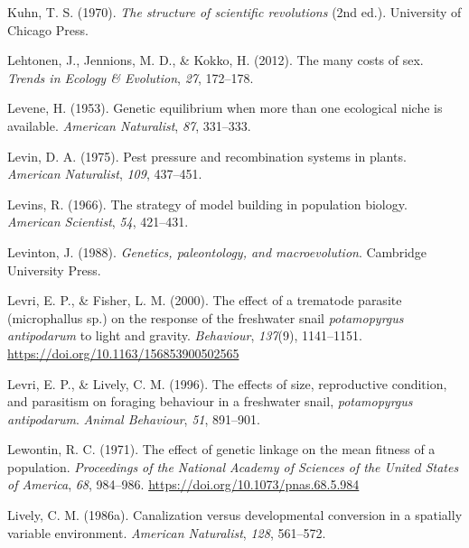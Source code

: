 \documentclass[
  letterpaper,
]{book}
\newlength{\cslhangindent}
\newlength{\cslentryspacingunit} %
\newenvironment{CSLReferences}[2] %
 {%
  \setlength{\parindent}{0pt}
  \ifodd #1
  \let\oldpar\par
  \def\par{\hangindent=\cslhangindent\oldpar}
  \fi
  \setlength{\parskip}{#2\cslentryspacingunit}
 }%
 {}
\begin{document}
\begin{CSLReferences}{1}{0}
\leavevmode{}%
Kuhn, T. S. (1970). \emph{The structure of scientific revolutions} (2nd
ed.). University of Chicago Press.

\leavevmode{}%
Lehtonen, J., Jennions, M. D., \& Kokko, H. (2012). The many costs of
sex. \emph{Trends in Ecology \& Evolution}, \emph{27}, 172--178.

\leavevmode{}%
Levene, H. (1953). Genetic equilibrium when more than one ecological
niche is available. \emph{American Naturalist}, \emph{87}, 331--333.

\leavevmode{}%
Levin, D. A. (1975). Pest pressure and recombination systems in plants.
\emph{American Naturalist}, \emph{109}, 437--451.

\leavevmode{}%
Levins, R. (1966). The strategy of model building in population biology.
\emph{American Scientist}, \emph{54}, 421--431.

\leavevmode{}%
Levinton, J. (1988). \emph{Genetics, paleontology, and macroevolution}.
Cambridge University Press.

\leavevmode{}%
Levri, E. P., \& Fisher, L. M. (2000). The effect of a trematode
parasite (microphallus sp.) on the response of the freshwater snail
\emph{potamopyrgus antipodarum} to light and gravity. \emph{Behaviour},
\emph{137}(9), 1141--1151. \url{https://doi.org/10.1163/156853900502565}

\leavevmode{}%
Levri, E. P., \& Lively, C. M. (1996). The effects of size, reproductive
condition, and parasitism on foraging behaviour in a freshwater snail,
\emph{potamopyrgus antipodarum}. \emph{Animal Behaviour}, \emph{51},
891--901.

\leavevmode{}%
Lewontin, R. C. (1971). The effect of genetic linkage on the mean
fitness of a population. \emph{Proceedings of the National Academy of
Sciences of the United States of America}, \emph{68}, 984--986.
\url{https://doi.org/10.1073/pnas.68.5.984}

\leavevmode{}%
Lively, C. M. (1986a). Canalization versus developmental conversion in a
spatially variable environment. \emph{American Naturalist}, \emph{128},
561--572.


\end{CSLReferences}
\end{document}
